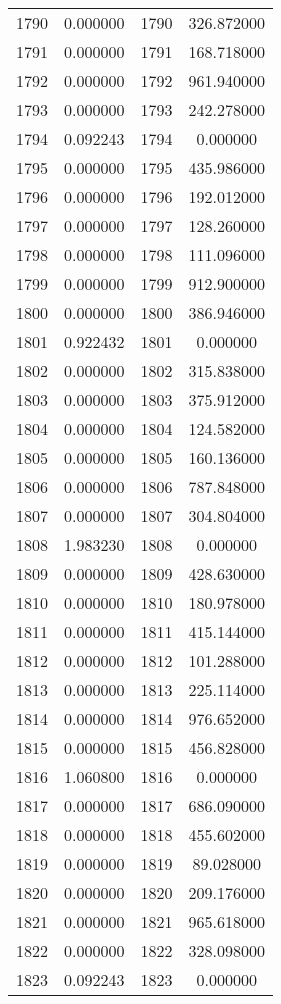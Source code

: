 \documentclass[12pt]{article}
\begin{document}
\begin{longtable}{@{}cccc@{}}
1790 & 0.000000 & 1790 & 326.872000 \\
1791 & 0.000000 & 1791 & 168.718000 \\
1792 & 0.000000 & 1792 & 961.940000 \\
1793 & 0.000000 & 1793 & 242.278000 \\
1794 & 0.092243 & 1794 & 0.000000 \\
1795 & 0.000000 & 1795 & 435.986000 \\
1796 & 0.000000 & 1796 & 192.012000 \\
1797 & 0.000000 & 1797 & 128.260000 \\
1798 & 0.000000 & 1798 & 111.096000 \\
1799 & 0.000000 & 1799 & 912.900000 \\
1800 & 0.000000 & 1800 & 386.946000 \\
1801 & 0.922432 & 1801 & 0.000000 \\
1802 & 0.000000 & 1802 & 315.838000 \\
1803 & 0.000000 & 1803 & 375.912000 \\
1804 & 0.000000 & 1804 & 124.582000 \\
1805 & 0.000000 & 1805 & 160.136000 \\
1806 & 0.000000 & 1806 & 787.848000 \\
1807 & 0.000000 & 1807 & 304.804000 \\
1808 & 1.983230 & 1808 & 0.000000 \\
1809 & 0.000000 & 1809 & 428.630000 \\
1810 & 0.000000 & 1810 & 180.978000 \\
1811 & 0.000000 & 1811 & 415.144000 \\
1812 & 0.000000 & 1812 & 101.288000 \\
1813 & 0.000000 & 1813 & 225.114000 \\
1814 & 0.000000 & 1814 & 976.652000 \\
1815 & 0.000000 & 1815 & 456.828000 \\
1816 & 1.060800 & 1816 & 0.000000 \\
1817 & 0.000000 & 1817 & 686.090000 \\
1818 & 0.000000 & 1818 & 455.602000 \\
1819 & 0.000000 & 1819 & 89.028000 \\
1820 & 0.000000 & 1820 & 209.176000 \\
1821 & 0.000000 & 1821 & 965.618000 \\
1822 & 0.000000 & 1822 & 328.098000 \\
1823 & 0.092243 & 1823 & 0.000000 \\

\end{longtable}
\end{document}
